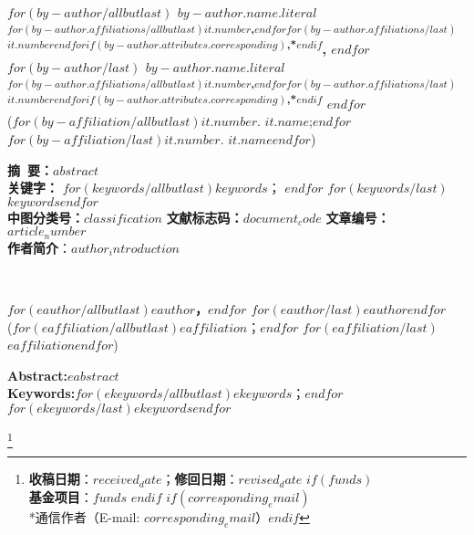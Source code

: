 \twocolumn
\begin{figure*}[t]
\begin{center}
 \parbox{\textwidth}{
   \begin{center}
      \\
     \vspace{10pt}
   \end{center}
   \begin{center}
    \textbf{
      $for(by-author/allbutlast)$
        $by-author.name.literal$
        \textsuperscript{$for(by-author.affiliations/allbutlast)$$it.number$,$endfor$$for(by-author.affiliations/last)$$it.number$$endfor$$if(by-author.attributes.corresponding)$,*$endif$},
      $endfor$
      $for(by-author/last)$
        $by-author.name.literal$
        \textsuperscript{$for(by-author.affiliations/allbutlast)$$it.number$,$endfor$$for(by-author.affiliations/last)$$it.number$$endfor$$if(by-author.attributes.corresponding)$,*$endif$}
      $endfor$
    }\\[2pt]
    \small{
      ($for(by-affiliation/allbutlast)$$it.number$. $it.name$;$endfor$
      $for(by-affiliation/last)$$it.number$. $it.name$$endfor$)}\\[7pt]
    \end{center}
   {
    \small{
      \textbf{摘~要：}$abstract$ \\
      \textbf{关键字：} $for(keywords/allbutlast)$$keywords$； $endfor$ $for(keywords/last)$$keywords$$endfor$ \\
      \textbf{中图分类号：}$classification$ \hfill
      \textbf{文献标志码：}$document_code$ \hfill
      \textbf{文章编号：}$article_number$ \\
      \textbf{作者简介}：$author_introduction$
    }
  }
}
\end{center}

\begin{center}
 \parbox{\textwidth}{
   \begin{center}
      \vspace{20pt}
       \\
      \vspace{10pt}
   \end{center}
   \begin{center}
    \textbf{
      $for(eauthor/allbutlast)$$eauthor$，$endfor$
      $for(eauthor/last)$$eauthor$$endfor$
    }\\[2pt]
    \small{
      ($for(eaffiliation/allbutlast)$$eaffiliation$；$endfor$
      $for(eaffiliation/last)$$eaffiliation$$endfor$)}\\[7pt]
    \end{center}
   {
    \small{
      \textbf{Abstract:}\quad $eabstract$ \\
      \textbf{Keywords:}\quad $for(ekeywords/allbutlast)$$ekeywords$；$endfor$ $for(ekeywords/last)$$ekeywords$$endfor$
    }
   }
 }
\end{center}
\end{figure*}

\footnote{ 
  \textbf{收稿日期}：$received_date$；\textbf{修回日期}：$revised_date$
  $if(funds)$ \\\textbf{基金项目}：$funds$ $endif$
  $if(corresponding_email)$ \\ *通信作者（E-mail: $corresponding_email$）$endif$
}

\pagestyle{fancy}

